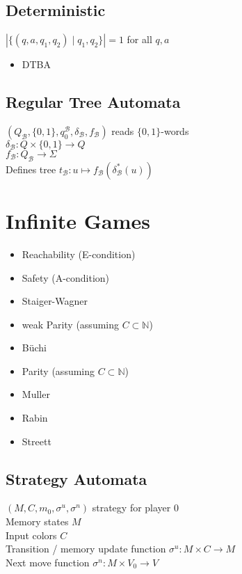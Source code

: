 \documentclass{article}
\begin{document}
\subsection{Deterministic}
$| \{ (q, a, q_1, q_2) \mid q_1, q_2 \} | = 1$ for all $q, a$

\begin{itemize}
	\item DTBA
\end{itemize}

\subsection{Regular Tree Automata}
$(Q_\mathcal{B}, \{0, 1\}, q_0^\mathcal{B}, \delta_\mathcal{B}, f_\mathcal{B})$ reads $\{0,1\}$-words \\
$\delta_\mathcal{B} : Q \times \{0, 1\} \rightarrow Q$ \\
$f_\mathcal{B} : Q_\mathcal{B} \rightarrow \Sigma$ \\

Defines tree $t_\mathcal{B} : u \mapsto f_\mathcal{B}(\delta^*_\mathcal{B}(u))$



\newpage
\section{Infinite Games}
\begin{itemize}
	\item Reachability (E-condition)
	\item Safety (A-condition)
	\item Staiger-Wagner
	\item weak Parity (assuming $C \subset \mathbb{N}$)
	\item Büchi
	\item Parity (assuming $C \subset \mathbb{N}$)
	\item Muller
	\item Rabin
	\item Streett 
\end{itemize}

\subsection{Strategy Automata}
$(M, C, m_0, \sigma^u, \sigma^n)$ strategy for player 0 \\
Memory states $M$ \\
Input colors $C$ \\
Transition / memory update function $\sigma^u : M \times C \rightarrow M$ \\
Next move function $\sigma^n : M \times V_0 \rightarrow V$
\end{document}
